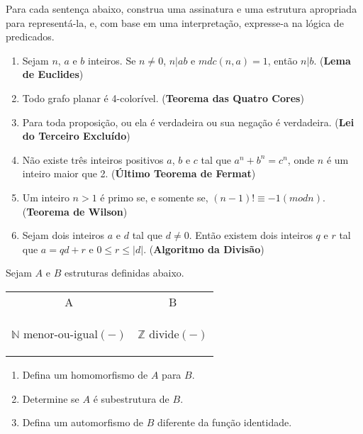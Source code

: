 \begin{exercises}
    \begin{question}
        Para cada sentença abaixo, construa uma assinatura e uma estrutura apropriada para representá-la, e, com base em uma interpretação, expresse-a na lógica de predicados.
        \begin{enumerate}
            \item Sejam $n$, $a$ e $b$ inteiros. Se $n \neq 0$, $n|ab$ e $mdc(n, a) = 1$, então $n|b$. (\textbf{Lema de Euclides})
            \item Todo grafo planar é 4-colorível. (\textbf{Teorema das Quatro Cores})
            \item Para toda proposição, ou ela é verdadeira ou sua negação é verdadeira. (\textbf{Lei do Terceiro Excluído})
            \item Não existe três inteiros positivos $a$, $b$ e $c$ tal que $a^n + b^n = c^n$, onde $n$ é um inteiro maior que 2. (\textbf{Último Teorema de Fermat})
            \item Um inteiro $n > 1$ é primo se, e somente se, $(n - 1)! \equiv -1 (mod n)$. (\textbf{Teorema de Wilson})
            \item Sejam dois inteiros $a$ e $d$ tal que $d \neq 0$. Então existem dois inteiros $q$ e $r$ tal que $a = qd + r$ e $0 \leq r \leq |d|$. (\textbf{Algoritmo da Divisão}) 
        \end{enumerate}
    \end{question}

    \begin{question}
        Sejam $A$ e $B$ estruturas definidas abaixo.
        \begin{table}[h!]
            \centering
            \begin{tabular}{c c}
                A & B \\
                \begin{structure}
                    {$\mathbb{N}$}
                    {}
                    {menor-ou-igual$(-)$}
                    {}
                    {}
                \end{structure}
                &
                \begin{structure}
                    {$\mathbb{Z}$}
                    {}
                    {divide$(-)$}
                    {}
                    {}
                \end{structure}
            \end{tabular}
        \end{table}
        \begin{enumerate}
            \item Defina um homomorfismo de $A$ para $B$.
            \item Determine se $A$ é subestrutura de $B$.
            \item Defina um automorfismo de $B$ diferente da função identidade.
        \end{enumerate}
    \end{question}


\end{exercises}
